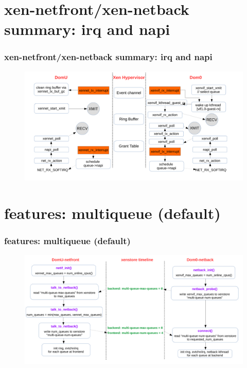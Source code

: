\documentclass[aspectratio=169]{beamer}
\begin{document}

\section{xen-netfront/xen-netback summary: irq and napi}
\begin{frame}
\frametitle{xen-netfront/xen-netback summary: irq and napi}
\begin{figure}
\includegraphics[width=1.0\linewidth]{figures/irq_napi.pdf}
\end{figure}
\end{frame}


\section{features: multiqueue (default)}
\begin{frame}
\frametitle{features: multiqueue (default)}
\begin{figure}
\includegraphics[width=1.0\linewidth]{figures/multiqueue.pdf}
\end{figure}
\end{frame}
\end{document}
